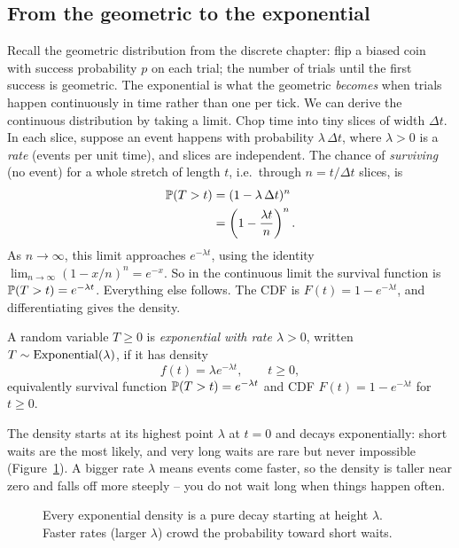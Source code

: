 \subsection{From the geometric to the exponential}
Recall the geometric distribution from the discrete chapter: flip a biased coin
with success probability $p$ on each trial; the number of trials until the first
success is geometric. The exponential is what the geometric \emph{becomes} when
trials happen continuously in time rather than one per tick.
We can derive the continuous distribution by taking a limit. Chop time into tiny slices of width $\Delta t$. In
each slice, suppose an event happens with probability $\lambda\,\Delta t$, where
$\lambda > 0$ is a \emph{rate} (events per unit time), and slices are
independent. The chance of \emph{surviving} (no event) for a whole stretch of
length $t$, i.e.\ through $n = t/\Delta t$ slices, is
\begin{align*}
  \P(T > t) &= (1 - \lambda\,\Delta t)^{n} \\
            &= \left(1 - \frac{\lambda t}{n}\right)^{n}.
\end{align*}
As $n \to \infty$, this limit approaches $e^{-\lambda t}$, using the identity $\lim_{n \to \infty} (1 - x/n)^n = e^{-x}$. So in the continuous limit the survival
function is $\P(T>t) = e^{-\lambda t}$. Everything else follows. The CDF is
$F(t) = 1 - e^{-\lambda t}$, and differentiating gives the density.
\begin{definition}
\label{ch11:def-exponential}
A random variable $T \ge 0$ is \emph{exponential with rate $\lambda > 0$},
written $T \sim \Expo(\lambda)$, if it has density
\[
  f(t) = \lambda e^{-\lambda t}, \qquad t \ge 0,
\]
equivalently survival function $\P(T > t) = e^{-\lambda t}$ and
CDF $F(t) = 1 - e^{-\lambda t}$ for $t \ge 0$.
\end{definition}
The density starts at its highest point $\lambda$ at $t=0$ and decays
exponentially: short waits are the most likely, and very long waits are rare but
never impossible (Figure~\ref{ch11:fig-expo}). A bigger rate $\lambda$ means
events come faster, so the density is taller near zero and falls off more
steeply -- you do not wait long when things happen often.
\begin{figure}[H]
\centering
{}
\caption{Every exponential density is a pure decay starting at height $\lambda$.
Faster rates (larger $\lambda$) crowd the probability toward short waits.}
\label{ch11:fig-expo}
\end{figure}
